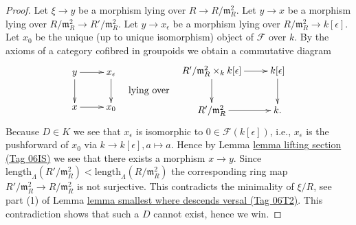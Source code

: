 \documentclass{amsart}
\theoremstyle{plain}
\theoremstyle{definition}
\theoremstyle{remark}
\numberwithin{equation}{subsection}
\begin{document}
\begin{proof}
\medskip\noindent
Let $\xi \to y$ be a morphism lying over $R \to R/\mathfrak m_R^2$.
Let $y \to x$ be a morphism lying over
$R/\mathfrak m_R^2 \to R'/\mathfrak m_R^2$.
Let $y \to x_\epsilon$ be a morphism lying over
$R/\mathfrak m_R^2 \to k[\epsilon]$. Let $x_0$ be the unique (up to unique
isomorphism) object of $\mathcal{F}$ over $k$.
By the axioms of a category cofibred in groupoids we obtain
a commutative diagram
$$
\vcenter{
\xymatrix{
y \ar[r] \ar[d] & x_\epsilon \ar[d] \\
x \ar[r]   & x_0
}
}
\quad\text{lying over}\quad
\vcenter{
\xymatrix{
R'/\mathfrak m_R^2 \times_k k[\epsilon] \ar[r] \ar[d] & k[\epsilon] \ar[d] \\
R'/\mathfrak m_R^2 \ar[r] & k.
}
}
$$
Because $D \in K$ we see that $x_\epsilon$ is isomorphic
to $0 \in \mathcal{F}(k[\epsilon])$, i.e., $x_\epsilon$ is
the pushforward of $x_0$ via $k \to k[\epsilon], a \mapsto a$.
Hence by
Lemma \href{https://stacks.math.columbia.edu/tag/06IS}{lemma lifting section (Tag 06IS)}
we see that there exists a morphism $x \to y$. Since
$\text{length}_\Lambda(R'/\mathfrak m_R^2) <
\text{length}_\Lambda(R/\mathfrak m_R^2)$
the corresponding ring map $R'/\mathfrak m_R^2 \to R/\mathfrak m_R^2$
is not surjective. This contradicts the minimality of
$\xi/R$, see part (1) of
Lemma \href{https://stacks.math.columbia.edu/tag/06T2}{lemma smallest where descends versal (Tag 06T2)}.
This contradiction shows that such a $D$ cannot exist, hence
we win.
\end{proof}
\end{document}
